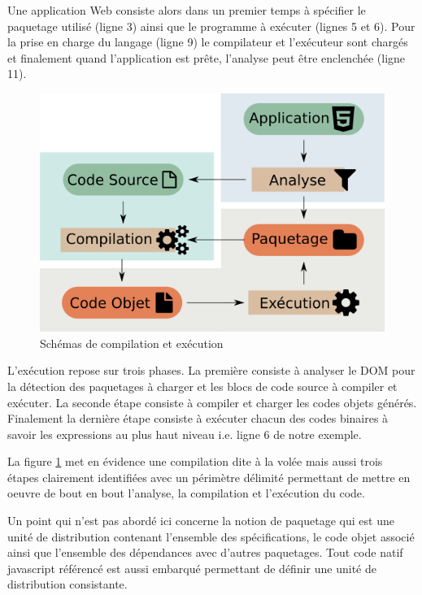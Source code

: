 \documentclass[twoside,a4paper]{article}
\begin{document}
Une application Web  consiste alors dans un premier  temps à spécifier
le  paquetage utilisé  (ligne 3)  ainsi  que le  programme à  exécuter
(lignes 5  et 6).   Pour la prise  en charge du  langage (ligne  9) le
compilateur   et  l'exécuteur   sont  chargés   et  finalement   quand
l'application est prête, l'analyse peut être enclenchée (ligne 11).

\begin{figure}[h]
\centering
\includegraphics[scale=0.45]{repl} 
\caption{Schémas de compilation et exécution}
\label{repl}
\end{figure}

L'exécution repose sur  trois phases. La première  consiste à analyser
le DOM pour la détection des paquetages à charger et les blocs de code
source à compiler et exécuter. La seconde étape consiste à compiler et
charger  les  codes  objets  générés.  Finalement  la  dernière  étape
consiste à exécuter chacun des codes binaires à savoir les expressions
au plus haut niveau i.e. ligne 6 de notre exemple.

La figure \ref{repl}  met en évidence une compilation dite  à la volée
mais  aussi  trois étapes  clairement  identifiées  avec un  périmètre
délimité permettant de mettre en oeuvre  de bout en bout l'analyse, la
compilation et l'exécution du code.

Un point qui n'est pas abordé  ici concerne la notion de paquetage qui
est une unité de distribution contenant l'ensemble des spécifications,
le  code  objet associé  ainsi  que  l'ensemble des  dépendances  avec
d'autres paquetages.   Tout code natif javascript  référencé est aussi
embarqué permettant de définir une unité de distribution consistante.
\end{document}
